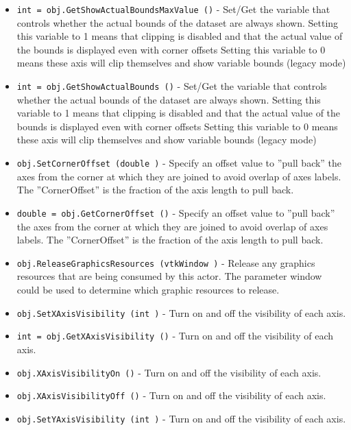 \begin{itemize}
\item  \verb|int = obj.GetShowActualBoundsMaxValue ()| -  Set/Get the variable that controls whether the actual
 bounds of the dataset are always shown. Setting this variable
 to 1 means that clipping is disabled and that the actual
 value of the bounds is displayed even with corner offsets
 Setting this variable to 0 means these axis will clip
 themselves and show variable bounds (legacy mode)

\item  \verb|int = obj.GetShowActualBounds ()| -  Set/Get the variable that controls whether the actual
 bounds of the dataset are always shown. Setting this variable
 to 1 means that clipping is disabled and that the actual
 value of the bounds is displayed even with corner offsets
 Setting this variable to 0 means these axis will clip
 themselves and show variable bounds (legacy mode)

\item  \verb|obj.SetCornerOffset (double )| -  Specify an offset value to ''pull back'' the axes from the corner at
 which they are joined to avoid overlap of axes labels. The 
 ''CornerOffset'' is the fraction of the axis length to pull back.

\item  \verb|double = obj.GetCornerOffset ()| -  Specify an offset value to ''pull back'' the axes from the corner at
 which they are joined to avoid overlap of axes labels. The 
 ''CornerOffset'' is the fraction of the axis length to pull back.

\item  \verb|obj.ReleaseGraphicsResources (vtkWindow )| -  Release any graphics resources that are being consumed by this actor.
 The parameter window could be used to determine which graphic
 resources to release.

\item  \verb|obj.SetXAxisVisibility (int )| -  Turn on and off the visibility of each axis.

\item  \verb|int = obj.GetXAxisVisibility ()| -  Turn on and off the visibility of each axis.

\item  \verb|obj.XAxisVisibilityOn ()| -  Turn on and off the visibility of each axis.

\item  \verb|obj.XAxisVisibilityOff ()| -  Turn on and off the visibility of each axis.

\item  \verb|obj.SetYAxisVisibility (int )| -  Turn on and off the visibility of each axis.


\end{itemize}
